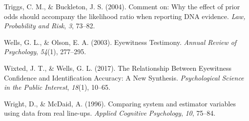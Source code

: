 \documentclass[10pt,dvipsnames,enabledeprecatedfontcommands]{scrartcl}
\begin{document}
\hypertarget{ref-triggsCommentWhyEffect}{}
Triggs, C. M., \& Buckleton, J. S. (2004). Comment on: Why the effect of
prior odds should accompany the likelihood ratio when reporting DNA
evidence. \emph{Law, Probability and Risk}, \emph{3}, 73--82.

\hypertarget{ref-wells2003EyewitnessTestimony}{}
Wells, G. L., \& Olson, E. A. (2003). Eyewitness Testimony. \emph{Annual
Review of Psychology}, \emph{54}(1), 277--295.

\hypertarget{ref-wixted2017RelationshipEyewitnessConfidence}{}
Wixted, J. T., \& Wells, G. L. (2017). The Relationship Between
Eyewitness Confidence and Identification Accuracy: A New Synthesis.
\emph{Psychological Science in the Public Interest}, \emph{18}(1),
10--65.

\hypertarget{ref-Wright1996ComparingSystemEstimator}{}
Wright, D., \& McDaid, A. (1996). Comparing system and estimator
variables using data from real line-ups. \emph{Applied Cognitive
Psychology}, \emph{10}, 75--84.
\end{document}
